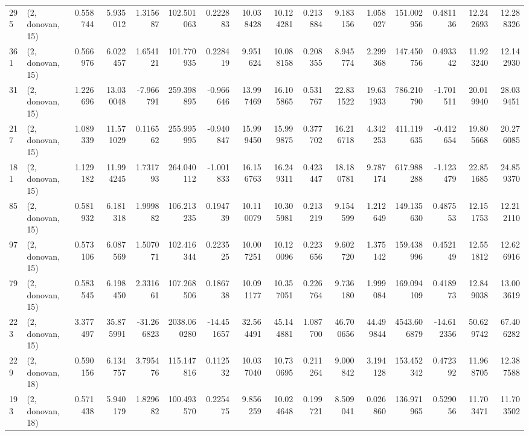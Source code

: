 \begin{tabular}{llrrrrrrrrrrrrrr}
295 &  (2, donovan, 15) &   0.558744 &   5.935012 &   1.315687 &   102.501063 &   0.222883 &  10.038428 &  10.124281 &  0.213884 &   9.183156 &   1.058027 &    151.002956 &    0.481136 &   12.242693 &   12.288326 \\
361 &  (2, donovan, 15) &   0.566976 &   6.022457 &   1.654121 &   101.770935 &   0.228419 &   9.951624 &  10.088158 &  0.208355 &   8.945774 &   2.299368 &    147.450756 &    0.493342 &   11.923240 &   12.142930 \\
31  &  (2, donovan, 15) &   1.226696 &  13.030048 &  -7.966791 &   259.398895 &  -0.966646 &  13.997469 &  16.105865 &  0.531767 &  22.831522 &  19.631933 &    786.210790 &   -1.701511 &   20.019940 &   28.039451 \\
217 &  (2, donovan, 15) &   1.089339 &  11.571029 &   0.116562 &   255.995995 &  -0.940847 &  15.999450 &  15.999875 &  0.377702 &  16.216718 &   4.342253 &    411.119635 &   -0.412654 &   19.805668 &   20.276085 \\
181 &  (2, donovan, 15) &   1.129182 &  11.994245 &   1.731793 &   264.040112 &  -1.001833 &  16.156763 &  16.249311 &  0.423447 &  18.180781 &   9.787174 &    617.988288 &   -1.123479 &   22.851685 &   24.859370 \\
85  &  (2, donovan, 15) &   0.581932 &   6.181318 &   1.999882 &   106.213235 &   0.194739 &  10.110079 &  10.305981 &  0.213219 &   9.154599 &   1.212649 &    149.135630 &    0.487553 &   12.151753 &   12.212110 \\
97  &  (2, donovan, 15) &   0.573106 &   6.087569 &   1.507071 &   102.416344 &   0.223525 &  10.007251 &  10.120096 &  0.223656 &   9.602720 &   1.375142 &    159.438996 &    0.452149 &   12.551812 &   12.626916 \\
79  &  (2, donovan, 15) &   0.583545 &   6.198450 &   2.331661 &   107.268506 &   0.186738 &  10.091177 &  10.357051 &  0.226764 &   9.736180 &   1.999084 &    169.094109 &    0.418973 &   12.849038 &   13.003619 \\
223 &  (2, donovan, 15) &   3.377497 &  35.875991 & -31.266823 &  2038.060280 & -14.451657 &  32.564491 &  45.144881 &  1.087700 &  46.700656 &  44.499844 &   4543.606879 &  -14.612356 &   50.629742 &   67.406282 \\
229 &  (2, donovan, 18) &   0.590156 &   6.134757 &   3.795476 &   115.147816 &   0.112532 &  10.037040 &  10.730695 &  0.211264 &   9.000842 &   3.194128 &    153.452342 &    0.472392 &   11.968705 &   12.387588 \\
193 &  (2, donovan, 18) &   0.571438 &   5.940179 &   1.829682 &   100.493570 &   0.225475 &   9.856259 &  10.024648 &  0.199721 &   8.509041 &   0.026860 &    136.971965 &    0.529056 &   11.703471 &   11.703502 \\

\end{tabular}
